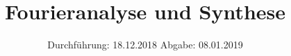 

\subject{V351}
\title{Fourieranalyse und Synthese}
\date{%
  Durchführung: 18.12.2018
  \hspace{3em}
  Abgabe: 08.01.2019
}



\maketitle
\thispagestyle{empty}
\tableofcontents
\newpage





\nocite{V351}
\printbibliography{}



